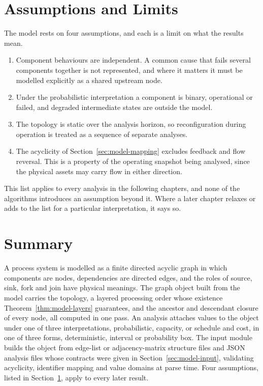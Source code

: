 \documentclass[12pt]{report}
\begin{document}
\section{Assumptions and Limits}
\label{sec:model-assumptions}

The model rests on four assumptions, and each is a limit on what the results mean.

\begin{enumerate}
  \item Component behaviours are independent. A common cause that fails several components
    together is not represented, and where it matters it must be modelled explicitly as a
    shared upstream node.
  \item Under the probabilistic interpretation a component is binary, operational or failed, and
    degraded intermediate states are outside the model.
  \item The topology is static over the analysis horizon, so reconfiguration during operation
    is treated as a sequence of separate analyses.
  \item The acyclicity of Section~\ref{sec:model-mapping} excludes feedback and flow reversal.
    This is a property of the operating snapshot being analysed, since the physical assets
    may carry flow in either direction.
\end{enumerate}

This list applies to every analysis in the following chapters, and none of the algorithms
introduces an assumption beyond it. Where a later chapter relaxes or adds to the list for a
particular interpretation, it says so.

\section{Summary}
\label{sec:model-summary}

A process system is modelled as a finite directed acyclic graph in which components are nodes,
dependencies are directed edges, and the roles of source, sink, fork and join have physical
meanings. The graph object built from the model carries the topology, a layered processing
order whose existence Theorem~\ref{thm:model-layers} guarantees, and the ancestor and
descendant closure of every node, all computed in one pass. An analysis attaches values to the
object under one of three interpretations, probabilistic, capacity, or schedule and cost, in one of
three forms, deterministic, interval or probability box. The input module builds the object
from edge-list or adjacency-matrix structure files and JSON analysis files whose contracts were
given in Section~\ref{sec:model-input}, validating acyclicity, identifier mapping and value
domains at parse time. Four assumptions, listed in Section~\ref{sec:model-assumptions}, apply to every later
result.

\ifdefined\maindoc
\else
\printbibliography
\end{document}
